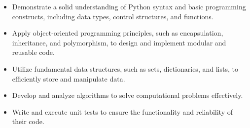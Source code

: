 \begin{itemize}
    \item Demonstrate a solid understanding of Python syntax and basic programming constructs, including data types, control structures, and functions.
    \item Apply object-oriented programming principles, such as encapsulation, inheritance, and polymorphism, to design and implement modular and reusable code.
    \item Utilize fundamental data structures, such as sets, dictionaries, and lists, to efficiently store and manipulate data.
    \item Develop and analyze algorithms to solve computational problems effectively.
    \item Write and execute unit tests to ensure the functionality and reliability of their code.
\end{itemize}
